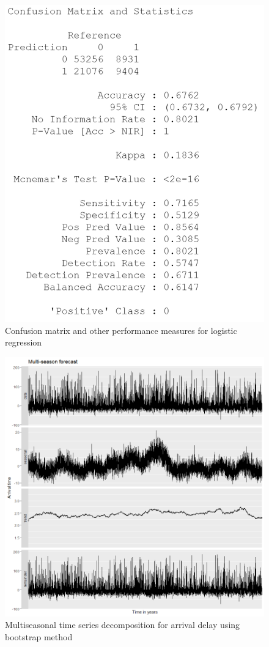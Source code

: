 \documentclass[12pt, a4paper, openany]{book}
\begin{document}
			\begin{figure}[h]
			\centering
	 		\includegraphics[width = .5\textwidth]{../figures/PLOTS FOR REPORT/Logistic Regression/confusion matrix - logit reg}
	 		\caption{Confusion matrix and other performance measures for logistic regression}
	 		\end{figure}

			\begin{figure}[h]
			\centering
	 		\includegraphics[width = 1 \textwidth]{../figures/timeseries_multiseason}
	 		\caption{Multiseasonal time series decomposition for arrival delay using bootstrap method}
	 		\end{figure}
\end{document}
